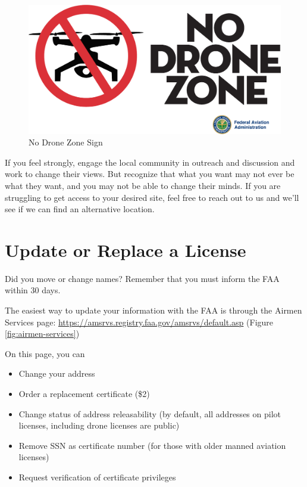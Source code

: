 \documentclass[
]{book}
\providecommand{\tightlist}{%
  \setlength{\itemsep}{0pt}\setlength{\parskip}{0pt}}
\begin{document}
\begin{figure}

{\centering \includegraphics[width=0.8\linewidth]{images/no-drone-zone} 

}

\caption{No Drone Zone Sign}\label{fig:no-drone-zone}
\end{figure}

If you feel strongly, engage the local community in outreach and discussion and work to change their views. But recognize that what you want may not ever be what they want, and you may not be able to change their minds. If you are struggling to get access to your desired site, feel free to reach out to us and we'll see if we can find an alternative location.

\hypertarget{ch-replace-license}{%
\chapter{Update or Replace a License}\label{ch-replace-license}}

Did you move or change names? Remember that you must inform the FAA within 30 days.

The easiest way to update your information with the FAA is through the Airmen Services page: \url{https://amsrvs.registry.faa.gov/amsrvs/default.asp} (Figure \ref{fig:airmen-services})

On this page, you can

\begin{itemize}
\tightlist
\item
  Change your address
\item
  Order a replacement certificate (\$2)
\item
  Change status of address releasability (by default, all addresses on pilot licenses, including drone licenses are public)
\item
  Remove SSN as certificate number (for those with older manned aviation licenses)
\item
  Request verification of certificate privileges
\end{itemize}
\end{document}
